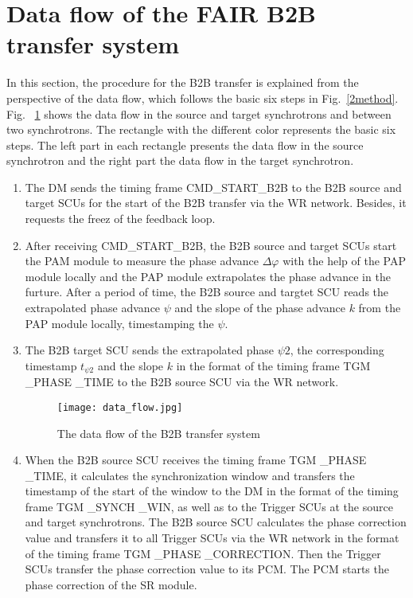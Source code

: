 \section{Data flow of the FAIR B2B transfer system}
In this section, the procedure for the B2B transfer is explained from the perspective of the data flow, which follows the basic six steps in Fig.~\ref{2method}. Fig. ~\ref{data_flow} shows the data flow in the source and target synchrotrons and between two synchrotrons. The rectangle with the different color represents the basic six steps. The left part in each rectangle presents the data flow in the source synchrotron and the right part the data flow in the target synchrotron.


\begin{enumerate}
\item The DM sends the timing frame CMD\_START\_B2B to the B2B source and target SCUs for the start of the B2B transfer via the WR network. Besides, it requests the freez of the feedback loop.

\item  After receiving CMD\_START\_B2B, the B2B source and target SCUs start the PAM module to measure the phase advance $\Delta \varphi$ with the help of the PAP module locally and the PAP module extrapolates the phase advance in the furture. After a period of time, the B2B source and targtet SCU reads the extrapolated phase advance $\psi$ and the slope of the phase advance $k$ from the PAP module locally, timestamping the $\psi$.  

\item  The B2B target SCU sends the extrapolated phase $\psi2$, the corresponding timestamp $t_{\psi2}$ and the slope $k$ in the format of the timing frame TGM \_PHASE \_TIME to the B2B source SCU via the WR network. 
\begin{figure}[!htb]
   \centering   
   \texttt{[image: data\_flow.jpg]}
   \caption{The data flow of the B2B transfer system}
   \label{data_flow}
\end{figure}  

\item  When the B2B source SCU receives the timing frame TGM \_PHASE \_TIME, it calculates the synchronization window and transfers the timestamp of the start of the window to the DM in the format of the timing frame TGM \_SYNCH \_WIN, as well as to the Trigger SCUs at the source and target synchrotrons.
The B2B source SCU calculates the phase correction value and transfers it to all Trigger SCUs via the WR network in the format of the timing frame TGM \_PHASE \_CORRECTION. Then the Trigger SCUs transfer the phase correction value to its \gls{PCM}. The PCM starts the phase correction of the SR module. 


\end{enumerate}
